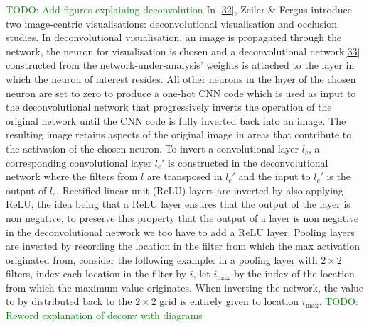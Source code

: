 \documentclass[A4paper,draft]{scrreprt}
\begin{document}
\textcolor{green}{TODO: Add figures explaining deconvolution}\newline
In
{[}\protect\hyperlink{ref-zeiler2013_VisualizingUnderstandingConvolutional}{32}{]},
Zeiler \& Fergus introduce two image-centric visualisations:
deconvolutional visualisation and occlusion studies. In deconvolutional
visualisation, an image is propagated through the network, the neuron
for visualisation is chosen and a deconvolutional
network{[}\protect\hyperlink{ref-zeiler2010_Deconvolutionalnetworks}{33}{]}
constructed from the network-under-analysis' weights is attached to the
layer in which the neuron of interest resides. All other neurons in the
layer of the chosen neuron are set to zero to produce a one-hot CNN code
which is used as input to the deconvolutional network that progressively
inverts the operation of the original network until the CNN code is
fully inverted back into an image. The resulting image retains aspects
of the original image in areas that contribute to the activation of the
chosen neuron. To invert a convolutional layer \(l_c\), a corresponding
convolutional layer \(l_c'\) is constructed in the deconvolutional
network where the filters from \(l\) are transposed in \(l_c'\) and the
input to \(l_c'\) is the output of \(l_c\). Rectified linear unit (ReLU)
layers are inverted by also applying ReLU, the idea being that a ReLU
layer ensures that the output of the layer is non negative, to preserve
this property that the output of a layer is non negative in the
deconvolutional network we too have to add a ReLU layer. Pooling layers
are inverted by recording the location in the filter from which the max
activation originated from, consider the following example: in a pooling
layer with \(2 \times 2\) filters, index each location in the filter by
\(i\), let \(i_{\text{max}}\) by the index of the location from which
the maximum value originates. When inverting the network, the value to
by distributed back to the \(2 \times 2\) grid is entirely given to
location \(i_{\text{max}}\).
\textcolor{green}{TODO: Reword explanation of deconv with diagrams}\newline
\end{document}
